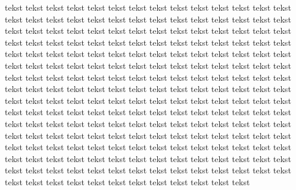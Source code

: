 \documentclass[a4paper]{article}
\begin{document}
tekst tekst tekst tekst tekst tekst \newline
tekst tekst tekst tekst tekst tekst \newline
tekst tekst tekst tekst tekst tekst \newline
tekst tekst tekst tekst tekst tekst \newline
tekst tekst tekst tekst tekst tekst \newline
tekst tekst tekst tekst tekst tekst \newline
tekst tekst tekst tekst tekst tekst \newline
tekst tekst tekst tekst tekst tekst \newline
tekst tekst tekst tekst tekst tekst \newline
tekst tekst tekst tekst tekst tekst \newline
tekst tekst tekst tekst tekst tekst \newline
tekst tekst tekst tekst tekst tekst \newline
tekst tekst tekst tekst tekst tekst \newline
tekst tekst tekst tekst tekst tekst \newline
tekst tekst tekst tekst tekst tekst \newline
tekst tekst tekst tekst tekst tekst \newline
tekst tekst tekst tekst tekst tekst \newline
tekst tekst tekst tekst tekst tekst \newline
tekst tekst tekst tekst tekst tekst \newline
tekst tekst tekst tekst tekst tekst \newline
tekst tekst tekst tekst tekst tekst \newline
tekst tekst tekst tekst tekst tekst \newline
tekst tekst tekst tekst tekst tekst \newline
tekst tekst tekst tekst tekst tekst \newline
tekst tekst tekst tekst tekst tekst \newline
tekst tekst tekst tekst tekst tekst \newline
tekst tekst tekst tekst tekst tekst \newline
tekst tekst tekst tekst tekst tekst \newline
tekst tekst tekst tekst tekst tekst \newline
tekst tekst tekst tekst tekst tekst \newline
tekst tekst tekst tekst tekst tekst \newline
tekst tekst tekst tekst tekst tekst \newline
tekst tekst tekst tekst tekst tekst \newline
tekst tekst tekst tekst tekst tekst \newline
tekst tekst tekst tekst tekst tekst \newline
tekst tekst tekst tekst tekst tekst \newline
tekst tekst tekst tekst tekst tekst \newline
\end{document}
